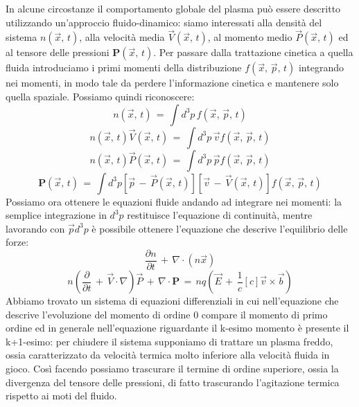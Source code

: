 In alcune circostanze il comportamento globale del plasma può essere descritto utilizzando un'approccio fluido-dinamico: 
siamo interessati alla densità del sistema $n\left(\vec{x},\,t\right)$, alla velocità media $\vec{V}\left(\vec{x},\,t\right)$,
al momento medio $\vec{P}\left(\vec{x},\,t\right)$ ed al tensore delle pressioni $\mathbf{P}\left(\vec{x},\,t\right)$. Per 
passare dalla trattazione cinetica a quella fluida introduciamo i primi momenti della distribuzione $f\left(\vec{x},\,\vec{p},\,t\right)$ 
integrando nei momenti, in modo tale da perdere l'informazione cinetica e mantenere solo quella spaziale. Possiamo quindi 
riconoscere:
\begin{equation}
    n\left(\vec{x},\,t\right)\,=\,\int d^3p \,f\left(\vec{x},\,\vec{p},\,t\right)
    \label{equation: numb_density}
\end{equation}
\begin{equation}
    n\left(\vec{x},\,t\right)\vec{V}\left(\vec{x},\,t\right)\,=\,\int d^3p\,\vec{v} f\left(\vec{x},\,\vec{p},\,t\right)
    \label{equation: mean_velocity}
\end{equation}
\begin{equation}
    n\left(\vec{x},\,t\right)\vec{P}\left(\vec{x},\,t\right)\,=\,\int d^3p\,\vec{p} f\left(\vec{x},\,\vec{p},\,t\right)
    \label{equation: p_tens}
\end{equation}
\begin{equation}
    \mathbf{P}\left(\vec{x},\,t\right)\,=\,\int d^3p\left[\vec{p}\,-\,\vec{P}\left(\vec{x},\,t\right)\right]\left[\vec{v}\,-\,\vec{V}\left(\vec{x},\,t\right)\right] f\left(\vec{x},\,\vec{p},\,t\right)
    \label{equation: p_tens1}
\end{equation}
Possiamo ora ottenere le equazioni fluide andando ad integrare nei momenti: la semplice integrazione in $d^3p$ restituisce 
l'equazione di continuità, mentre lavorando con $\vec{p}d^3p$ è possibile ottenere l'equazione che descrive l'equilibrio delle
forze:
\begin{equation}
    \frac{\partial n}{\partial t}\,+\,\nabla \cdot \left(n\vec{x}\right)
    \label{equation: continuity_eq}
\end{equation}
\begin{equation}
    n\left(\frac{\partial}{\partial t}\,+\,\vec{V}\cdot \nabla\right)\vec{P}\,+\,\nabla \cdot \mathbf{P}\,=\,nq\left(\vec{E}\,+\,\frac{1}{c}\left[c\right]\vec{v} \times \vec{b}\right)
    \label{equation: force_balance}
\end{equation}
Abbiamo trovato un sistema di equazioni differenziali in cui nell'equazione che descrive l'evoluzione del momento di ordine 0 
compare il momento di primo ordine ed in generale nell'equazione riguardante il k-esimo momento è presente il k+1-esimo: per 
chiudere il sistema supponiamo di trattare un plasma freddo, ossia caratterizzato da velocità termica molto inferiore alla 
velocità fluida in gioco. Così facendo possiamo trascurare il termine di ordine superiore, ossia la divergenza del tensore delle 
pressioni, di fatto trascurando l'agitazione termica rispetto ai moti del fluido.
